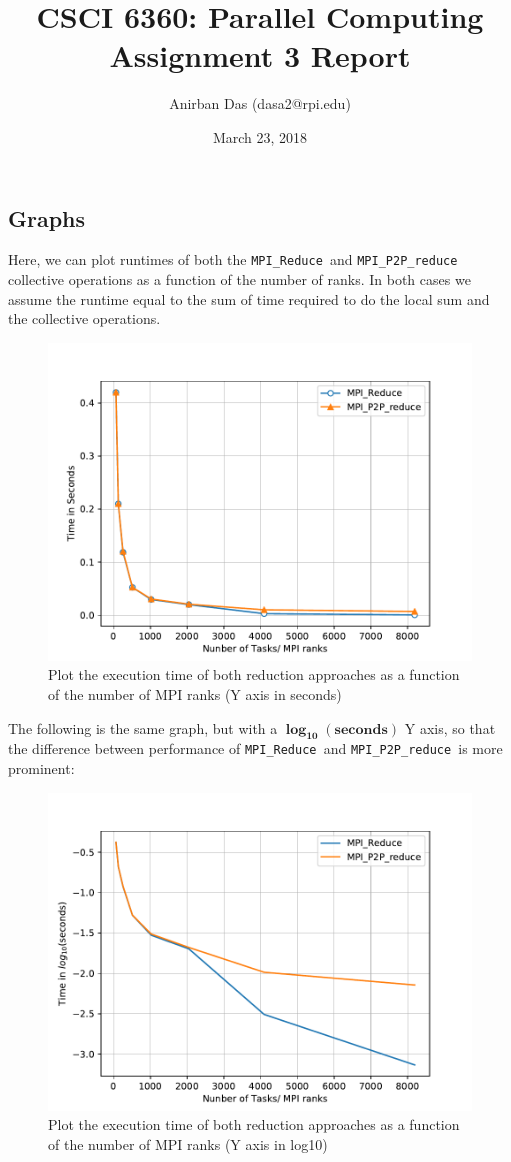 \documentclass[a4paper,12 pt]{article}
\title{\vspace{-2.0cm}CSCI 6360: Parallel Computing Assignment 3 Report}
\author{Anirban Das (dasa2@rpi.edu) }
\date{March 23, 2018}
\newcommand{\mpi}{\texttt{MPI\_Reduce }}
\newcommand{\pp}{\texttt{MPI\_P2P\_reduce }}
\begin{document}
\maketitle

\subsection{Graphs}
Here, we can plot runtimes of both the \mpi and \pp collective operations as a function of the number of ranks. In both cases we assume the runtime equal to the sum of time required to do the local sum and the collective operations. 
\begin{figure}[H]
	\centering
	\includegraphics[width=0.8\linewidth]{Graphs/MPI_vs_P2P}
  \caption{Plot the execution time of both reduction approaches as a function of the number of MPI ranks (Y axis in seconds)}
\end{figure}
The following is the same graph, but with a $\pmb{\log_{10}(seconds)}$ Y axis, so that the difference between performance of \mpi and \pp is more prominent:
\begin{figure}[H]
	\centering
	\includegraphics[width=\linewidth]{Graphs/MPI_vs_P2P_log}
  \caption{Plot the execution time of both reduction approaches as a function of the number of MPI ranks (Y axis in log10)}
\end{figure}
\end{document}
